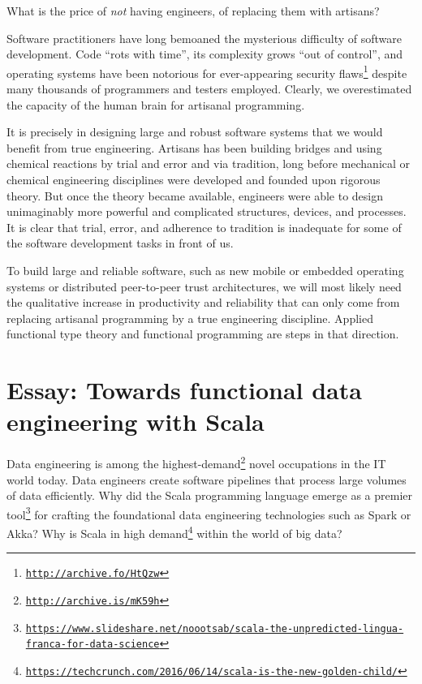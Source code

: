 What is the price of \emph{not} having engineers, of replacing them
with artisans?

Software practitioners have long bemoaned the mysterious difficulty
of software development. Code \textsf{``}rots with time\textsf{''}, its complexity
grows \textsf{``}out of control\textsf{''}, and operating systems have been notorious
for ever-appearing security flaws\footnote{\texttt{\href{http://archive.fo/HtQzw}{http://archive.fo/HtQzw}}}
despite many thousands of programmers and testers employed. Clearly,
we overestimated the capacity of the human brain for artisanal programming.

It is precisely in designing large and robust software systems that
we would benefit from true engineering. Artisans has been building
bridges and using chemical reactions by trial and error and via tradition,
long before mechanical or chemical engineering disciplines were developed
and founded upon rigorous theory. But once the theory became available,
engineers were able to design unimaginably more powerful and complicated
structures, devices, and processes. It is clear that trial, error,
and adherence to tradition is inadequate for some of the software
development tasks in front of us. 

To build large and reliable software, such as new mobile or embedded
operating systems or distributed peer-to-peer trust architectures,
we will most likely need the qualitative increase in productivity
and reliability that can only come from replacing artisanal programming
by a true engineering discipline. Applied functional type theory and
functional programming are steps in that direction.

\chapter{Essay: Towards functional data engineering with Scala}

Data engineering is among the highest-demand\footnote{\texttt{\href{http://archive.is/mK59h}{http://archive.is/mK59h}}}
novel occupations in the IT world today. Data engineers create software
pipelines that process large volumes of data efficiently. Why did
the Scala programming language emerge as a premier tool\footnote{\texttt{\href{https://www.slideshare.net/noootsab/scala-the-unpredicted-lingua-franca-for-data-science}{https://www.slideshare.net/noootsab/scala-the-unpredicted-lingua-franca-for-data-science}}}
for crafting the foundational data engineering technologies such as
Spark or Akka? Why is Scala in high demand\footnote{\texttt{\href{https://techcrunch.com/2016/06/14/scala-is-the-new-golden-child/}{https://techcrunch.com/2016/06/14/scala-is-the-new-golden-child/}}}
within the world of big data?

